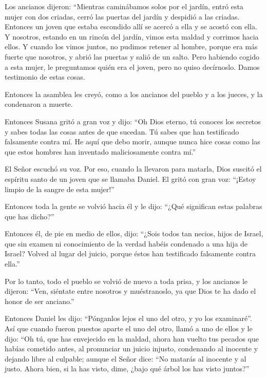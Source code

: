  Los ancianos dijeron: ``Mientras caminábamos solos por
el jardín, entró esta mujer con dos criadas, cerró las puertas del
jardín y despidió a las criadas.  Entonces un joven que
estaba escondido allí se acercó a ella y se acostó con ella.
 Y nosotros, estando en un rincón del jardín, vimos esta
maldad y corrimos hacia ellos.  Y cuando los vimos
juntos, no pudimos retener al hombre, porque era más fuerte que
nosotros, y abrió las puertas y salió de un salto.  Pero
habiendo cogido a esta mujer, le preguntamos quién era el joven, pero no
quiso decírnoslo. Damos testimonio de estas cosas.

 Entonces la asamblea les creyó, como a los ancianos del
pueblo y a los jueces, y la condenaron a muerte.

 Entonces Susana gritó a gran voz y dijo: ``Oh Dios
eterno, tú conoces los secretos y sabes todas las cosas antes de que
sucedan.  Tú sabes que han testificado falsamente contra
mí. He aquí que debo morir, aunque nunca hice cosas como las que estos
hombres han inventado maliciosamente contra mí.''

 El Señor escuchó su voz.  Por eso, cuando
la llevaron para matarla, Dios suscitó el espíritu santo de un joven que
se llamaba Daniel.  El gritó con gran voz: ``¡Estoy
limpio de la sangre de esta mujer!''

 Entonces toda la gente se volvió hacia él y le dijo:
``¿Qué significan estas palabras que has dicho?''

 Entonces él, de pie en medio de ellos, dijo: ``¿Sois
todos tan necios, hijos de Israel, que sin examen ni conocimiento de la
verdad habéis condenado a una hija de Israel?  Volved al
lugar del juicio, porque éstos han testificado falsamente contra ella.''

 Por lo tanto, todo el pueblo se volvió de nuevo a toda
prisa, y los ancianos le dijeron: ``Ven, siéntate entre nosotros y
muéstranoslo, ya que Dios te ha dado el honor de ser anciano.''

 Entonces Daniel les dijo: ``Pónganlos lejos el uno del
otro, y yo los examinaré''.  Así que cuando fueron
puestos aparte el uno del otro, llamó a uno de ellos y le dijo: ``Oh tú,
que has envejecido en la maldad, ahora han vuelto tus pecados que habías
cometido antes,  al pronunciar un juicio injusto,
condenando al inocente y dejando libre al culpable; aunque el Señor
dice: ``No matarás al inocente y al justo.  Ahora bien,
si la has visto, dime, ¿bajo qué árbol los has visto juntos?''

